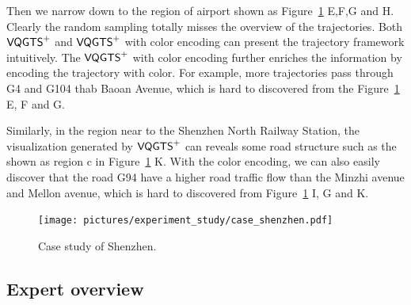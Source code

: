 Then we narrow down to the region of airport shown as Figure~\ref{fig:shenzhen} E,F,G and H. Clearly the random sampling totally misses the overview of the trajectories.  Both $\mathsf{VQGTS}^{+}$ and $\mathsf{VQGTS}^{+}$ with color encoding can present the trajectory framework intuitively. The $\mathsf{VQGTS}^{+}$ with color encoding further enriches the information by encoding the trajectory with color. For example, more trajectories pass through G4 and G104 thab Baoan Avenue, which is hard to discovered from the Figure~\ref{fig:shenzhen} E, F and G.  

Similarly, in the region near to the Shenzhen North Railway Station, the visualization generated by $\mathsf{VQGTS}^{+}$ can reveals some road structure such as the  shown as region c in Figure~\ref{fig:shenzhen} K. With the color encoding, we can also easily discover that the road G94 have a higher road traffic flow than the Minzhi avenue and Mellon avenue, which is hard to discovered from Figure~\ref{fig:shenzhen} I, G and K.

\begin{figure}[t]
	\centering
	\vspace{2mm}
	\texttt{[image: pictures/experiment\_study/case\_shenzhen.pdf]}
	\caption{Case study of Shenzhen.}
	\vspace{0mm}
	\label{fig:shenzhen}
\end{figure}



\subsection{Expert overview}

